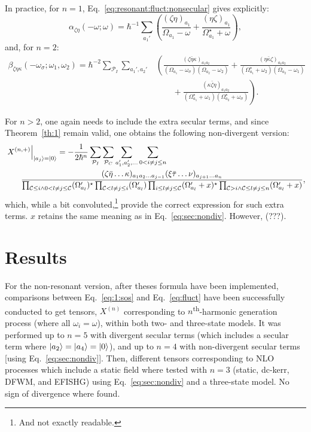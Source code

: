 \documentclass[12pt,a4paper]{article}
\begin{document}
In practice, for $n=1$, Eq.~\eqref{eq:resonant:fluct:nonsecular} gives explicitly:\begin{equation*}
	\alpha_{\zeta\eta}(-\omega; \omega) = \hbar^{-1} \sum_{a_1'} \left(\frac{(\zeta\eta)_{a_1}}{\Omega_{a_1} - \omega}+ \frac{(\eta\zeta)_{a_1}}{\Omega_{a_1}^\star + \omega}\right),
	\end{equation*}
	and, for $n=2$:
	\begin{align*}
	\beta_{\zeta\eta\kappa}(-\omega_\sigma; \omega_1, \omega_2) = \hbar^{-2} \sum_{\mathcal{P}_I} \sum_{a_1', a_2'} &\left(\frac{(\zeta\bar{\eta}\kappa)_{a_1 a_2}}{(\Omega_{a_1} - \omega_\sigma)(\Omega_{a_2} - \omega_2)}+ \frac{(\eta\bar\kappa\zeta)_{a_1 a_2}}{(\Omega_{a_1}^\star +\omega_2)(\Omega_{a_2} -\omega_1)}\right.\\
	&\hspace{2em}+\left.\frac{(\kappa\bar\zeta\eta)_{a_1 a_2}}{(\Omega_{a_1}^\star + \omega_1)(\Omega_{a_2}^\star + \omega_\sigma)} \right).
\end{align*}

For $n>2$, one again needs to include the extra secular terms, and since  Theorem~\ref{th:1}  remain valid, one obtains the following non-divergent version:\begin{align}
	&\left. X^{(n,+)} \right|_{\ket{a_j} = \ket{0}} = -\frac{1}{2\hbar^n} \sum_{\mathcal{P}_I} \sum_{\mathcal{P}_C}\sum_{a_1', a_2', \ldots} \sum_{0 < i \neq j \leq n} \nonumber\\
	&\hspace{2em}\frac{(\zeta \bar{\eta} \ldots \kappa)_{a_1 a_2 \ldots a_{j-1}} (\xi \bar{\tau} \ldots \nu)_{a_{j+1} \ldots a_n}}{\prod_{ \mathcal C \leq i \land 0 < l \neq j \leq \mathcal C } (\Omega'_{a_l})^\star \prod_{ \mathcal C < l \neq j \leq i} (\Omega'_{a_l}) \prod_{i \leq l \neq j \leq  \mathcal C} (\Omega'_{a_l} + x)^\star \prod_{ \mathcal C > i \land \mathcal C \leq l \neq j \leq  n} (\Omega'_{a_l} + x)}, \label{eq:resonant:sec:nondiv}
\end{align}
which, while a bit convoluted,\footnote{And not exactly readable.} provide the correct expression for such extra terms. $x$ retains the same meaning as in Eq.~\eqref{eq:sec:nondiv}. However, (???).

\section{Results}

For the non-resonant version, after theses formula have been implemented, comparisons between Eq.~\eqref{eq:1:sos} and Eq.~\eqref{eq:fluct} have been successfully conducted to get tensors, $X^{(n)}$ corresponding to $n$\textsuperscript{th}-harmonic generation process (where all $\omega_i = \omega$), within both two- and three-state models.
It was performed up to  $n = 5$ with divergent secular terms (which includes a secular term where $\ket{a_2} = \ket{a_4} = \ket{0}$), and up to $n=4$ with non-divergent secular terms [using Eq.~\eqref{eq:sec:nondiv}]. Then, different tensors corresponding to NLO processes which include a static field where tested with $n=3$ (static, dc-kerr, DFWM, and EFISHG) using Eq.~\eqref{eq:sec:nondiv} and a three-state model. No sign of divergence where found.
\end{document}
